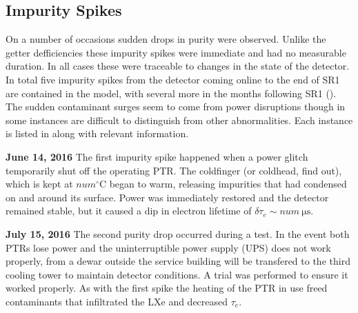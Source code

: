 \subsection{Impurity Spikes}
\label{subsec:electron_lifetime_model_detector_effects_spikes}
On a number of occasions sudden drops in purity were observed.  Unlike the getter defficiencies these impurity spikes were immediate and
had no measurable duration.  In all cases these were traceable to changes in the state of the detector.  In total five impurity spikes
from the detector coming online to the end of SR1 are contained in the model, with several more in the months following SR1
().  The
sudden contaminant surges seem to come from power disruptions though in some instances are difficult to distinguish from other
abnormalities.  Each instance is listed in  along with relevant
information.

\textbf{June 14, 2016}  The first impurity spike happened when a power glitch temporarily shut off the operating PTR.  The coldfinger (or
coldhead, find out), which is kept at $num^{\circ} \mathrm{C}$ began to warm, releasing impurities that had condensed on and around its
surface.  Power was immediately restored and the detector remained stable, but it caused a dip in electron lifetime of
$\delta \tau_e \sim num\ \mathrm{\mu s}$.

\textbf{July 15, 2016}  The second purity drop occurred during a \lntwo test.  In the event both PTRs lose power and the uninterruptible
power supply
(UPS) does not work properly, \lntwo from a dewar outside the service building will be transfered to the third cooling tower to maintain
detector conditions.  A trial was performed to ensure it worked properly.  As with the first spike the heating of the PTR in use freed
contaminants that infiltrated the LXe and decreased $\tau_e$.

